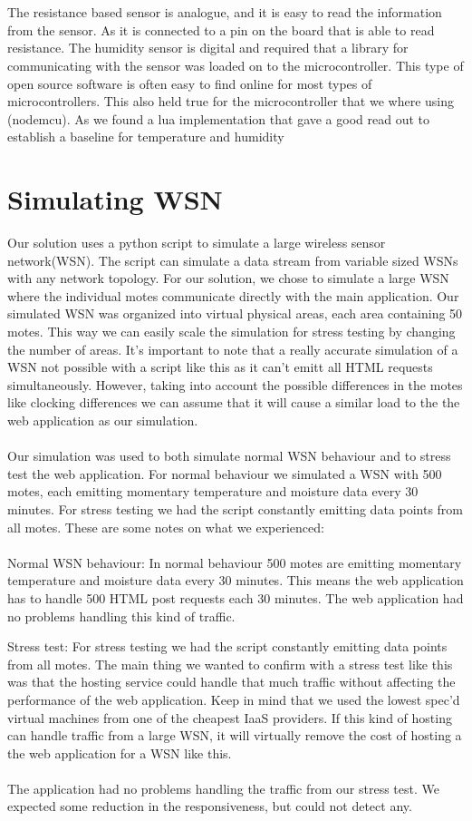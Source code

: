 \documentclass[]{uiophd}
\begin{document}
\\\\
The resistance based sensor is analogue, and it is easy to read the information from the sensor. As it is connected to a pin on the board that is able to read resistance. The humidity sensor is digital and required that a library for communicating with the sensor was loaded on to the microcontroller. This type of open source software is often easy to find online for most types of microcontrollers. This also held true for the microcontroller that we where using (nodemcu). As we found a lua implementation that gave a good read out to establish a baseline for temperature and humidity


\section{Simulating WSN}
Our solution uses a python script to simulate a large wireless sensor network(WSN). The script can simulate a data stream from variable sized WSNs with any network topology. For our solution, we chose to simulate a large WSN where the individual motes communicate directly with the main application. Our simulated WSN was organized into virtual physical areas, each area containing 50 motes. This way we can easily scale the simulation for stress testing by changing the number of areas. It’s important to note that a really accurate simulation of a WSN not possible with a script like this as it can’t emitt all HTML requests simultaneously. However, taking into account the possible differences in the motes like clocking differences we can assume that it will cause a similar load to the the web application as our simulation.
\\\\
Our simulation was used to both simulate normal WSN behaviour and to stress test the web application. For normal behaviour we simulated a WSN with 500 motes, each emitting momentary temperature and moisture data every 30 minutes. For stress testing we had the script constantly emitting data points from all motes. These are some notes on what we experienced:
\\\\
Normal WSN behaviour: In normal behaviour 500 motes are emitting momentary temperature and moisture data every 30 minutes. This means the web application has to handle 500 HTML post requests each 30 minutes. The web application had no problems handling this kind of traffic.


Stress test:  For stress testing we had the script constantly emitting data points from all motes. The main thing we wanted to confirm with a stress test like this was that the hosting service could handle that much traffic without affecting the performance of the web application. Keep in mind that we used the lowest spec’d virtual machines from one of the cheapest IaaS providers. If this kind of hosting can handle traffic from a large WSN, it will virtually remove the cost of hosting a the web application for a WSN like this. 
\\\\
The application had no problems handling the traffic from our stress test. We expected some reduction in the responsiveness, but could not detect any. 
\end{document}
